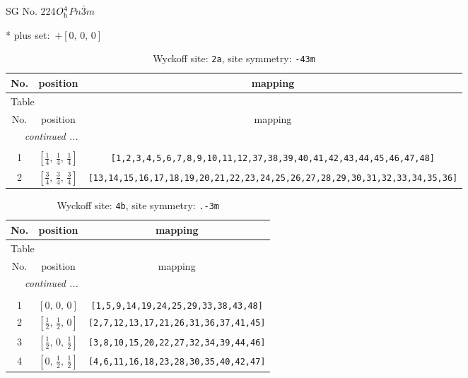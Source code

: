 \documentclass[fleqn,8pt]{jsarticle}
\begin{document}
\setcounter{MaxMatrixCols}{32}

\renewcommand{\tablename}{Table~}
\renewcommand{\figurename}{Figure~}
\begin{center}
\LARGE
SG No. 224\quad$O_{\rm h}^{4}$\quad$Pn\bar{3}m$\quad[ cubic ]
\end{center}
* plus set:\,\,\,$+\left[ 0,\, 0,\, 0 \right]$
\renewcommand{\arraystretch}{1.2}
\begin{longtable}{ccc}
\caption{Wyckoff site: {\tt 2a}, site symmetry: {\tt -43m}}
 \\
 \hline \hline
No. & position & mapping \\ \hline \endfirsthead

\multicolumn{2}{l}{\tablename\ \thetable{}} \\
 \hline \hline
No. & position & mapping \\ \hline \endhead

 \hline \hline
\multicolumn{2}{r}{\footnotesize\it continued ...} \\ \endfoot

 \hline \hline
\multicolumn{2}{r}{} \\ \endlastfoot

1 & $\left[ \frac{1}{4},\, \frac{1}{4},\, \frac{1}{4} \right]$ & {\tt [1,2,3,4,5,6,7,8,9,10,11,12,37,38,39,40,41,42,43,44,45,46,47,48]} \\ \hline
2 & $\left[ \frac{3}{4},\, \frac{3}{4},\, \frac{3}{4} \right]$ & {\tt [13,14,15,16,17,18,19,20,21,22,23,24,25,26,27,28,29,30,31,32,33,34,35,36]} \\
\end{longtable}
\renewcommand{\arraystretch}{1.2}
\begin{longtable}{ccc}
\caption{Wyckoff site: {\tt 4b}, site symmetry: {\tt .-3m}}
 \\
 \hline \hline
No. & position & mapping \\ \hline \endfirsthead

\multicolumn{2}{l}{\tablename\ \thetable{}} \\
 \hline \hline
No. & position & mapping \\ \hline \endhead

 \hline \hline
\multicolumn{2}{r}{\footnotesize\it continued ...} \\ \endfoot

 \hline \hline
\multicolumn{2}{r}{} \\ \endlastfoot

1 & $\left[ 0,\, 0,\, 0 \right]$ & {\tt [1,5,9,14,19,24,25,29,33,38,43,48]} \\ \hline
2 & $\left[ \frac{1}{2},\, \frac{1}{2},\, 0 \right]$ & {\tt [2,7,12,13,17,21,26,31,36,37,41,45]} \\ \hline
3 & $\left[ \frac{1}{2},\, 0,\, \frac{1}{2} \right]$ & {\tt [3,8,10,15,20,22,27,32,34,39,44,46]} \\ \hline
4 & $\left[ 0,\, \frac{1}{2},\, \frac{1}{2} \right]$ & {\tt [4,6,11,16,18,23,28,30,35,40,42,47]} \\
\end{longtable}
\end{document}
